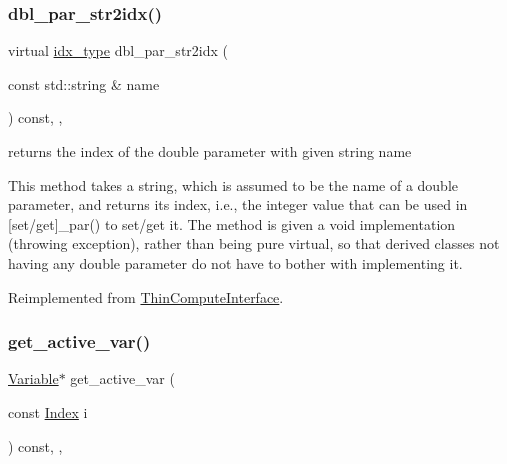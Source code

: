\subsubsection{\texorpdfstring{dbl\+\_\+par\+\_\+str2idx()}{dbl\_par\_str2idx()}}
{\footnotesize\ttfamily virtual \mbox{\hyperlink{class_s_m_spp__di__unipi__it_1_1_thin_compute_interface_aa3d710629ad8c434286726ad810c3b47}{idx\+\_\+type}} dbl\+\_\+par\+\_\+str2idx (\begin{DoxyParamCaption}\item[{const std\+::string \&}]{name }\end{DoxyParamCaption}) const\hspace{0.3cm}{\ttfamily [inline]}, {\ttfamily [override]}, {\ttfamily [virtual]}}



returns the index of the double parameter with given string name 

This method takes a string, which is assumed to be the name of a double parameter, and returns its index, i.\+e., the integer value that can be used in \mbox{[}set/get\mbox{]}\+\_\+par() to set/get it. The method is given a void implementation (throwing exception), rather than being pure virtual, so that derived classes not having any double parameter do not have to bother with implementing it. 

Reimplemented from \mbox{\hyperlink{class_s_m_spp__di__unipi__it_1_1_thin_compute_interface_a82f363814aa27e3243ba994a1ed5f39e}{Thin\+Compute\+Interface}}.

\mbox{\label{class_s_m_spp__di__unipi__it_1_1_f_real_objective_a1ba10c2bdb196783fa32ab9cae079203}} 
\subsubsection{\texorpdfstring{get\+\_\+active\+\_\+var()}{get\_active\_var()}}
{\footnotesize\ttfamily \mbox{\hyperlink{class_s_m_spp__di__unipi__it_1_1_variable}{Variable}}$\ast$ get\+\_\+active\+\_\+var (\begin{DoxyParamCaption}\item[{const \mbox{\hyperlink{group___thin_var_dep_interface___c_l_a_s_s_e_s_gad53d6229d7ec28555a9c9c2fd9abf773}{Index}}}]{i }\end{DoxyParamCaption}) const\hspace{0.3cm}{\ttfamily [inline]}, {\ttfamily [override]}, {\ttfamily [virtual]}}



